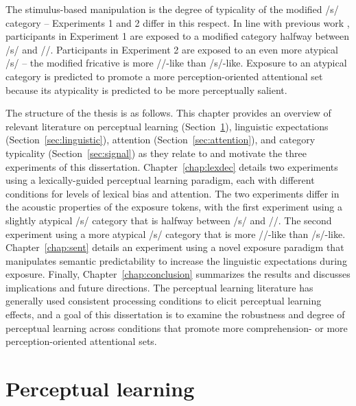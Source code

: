 The stimulus-based manipulation is the degree of typicality of the modified /s/ category -- Experiments 1 and 2 differ in this respect. 
In line with previous work \citep{Norris2003}, participants in Experiment 1 are exposed to a modified category halfway between /s/ and /\textesh/. 
Participants in Experiment 2 are exposed to an even more atypical /s/ -- the modified fricative is more /\textesh/-like than /s/-like.  
Exposure to an atypical category is predicted to promote a more perception-oriented attentional set because its atypicality is predicted to be more perceptually salient.

The structure of the thesis is as follows.
This chapter provides an overview of relevant literature on perceptual learning (Section~\ref{sec:perceptuallearning}), linguistic expectations (Section~\ref{sec:linguistic}), attention (Section~\ref{sec:attention}), and category typicality (Section~\ref{sec:signal}) as they relate to and motivate the three experiments of this dissertation.
Chapter~\ref{chap:lexdec} details two experiments using a lexically-guided perceptual learning paradigm, each with different conditions for levels of lexical bias and attention.  
The two experiments differ in the acoustic properties of the exposure tokens, with the first experiment using a slightly atypical /s/ category that is halfway between /s/ and /\textesh/.
The second experiment using a more atypical /s/ category that is more /\textesh/-like than /s/-like.  
Chapter~\ref{chap:sent} details an experiment using a novel exposure paradigm that manipulates semantic predictability to increase the linguistic expectations during exposure.
Finally, Chapter~\ref{chap:conclusion} summarizes the results and discusses implications and future directions.
The perceptual learning literature has generally used consistent processing conditions to elicit perceptual learning effects, and a goal of this dissertation is to examine the robustness and degree of perceptual learning across conditions that promote more comprehension- or more perception-oriented attentional sets.

\section{Perceptual learning}
\label{sec:perceptuallearning}


